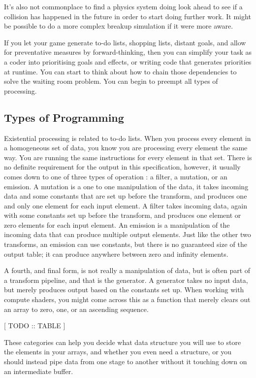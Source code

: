 \documentclass[a4paper,12pt]{article}
\begin{document}
It's also not commonplace to find a physics system doing look ahead to see if a collision has happened in the future in order to start doing further work.
It might be possible to do a more complex breakup simulation if it were more aware.

If you let your game generate to-do lists, shopping lists, distant goals, and allow for preventative measures by forward-thinking, then you can simplify your task as a coder into prioritising goals and effects, or writing code that generates priorities at runtime.
You can start to think about how to chain those dependencies to solve the waiting room problem.
You can begin to preempt all types of processing.

\subsection{Types of Programming}

Existential processing is related to to-do lists.
When you process every element in a homogeneous set of data, you know you are processing every element the same way.
You are running the same instructions for every element in that set.
There is no definite requirement for the output in this specification, however, it usually comes down to one of three types of operation :
a filter, a mutation, or an emission.
A mutation is a one to one manipulation of the data, it takes incoming data and some constants that are set up before the transform, and produces one and only one element for each input element.
A filter takes incoming data, again with some constants set up before the transform, and produces one element or zero elements for each input element.
An emission is a manipulation of the incoming data that can produce multiple output elements.
Just like the other two transforms, an emission can use constants, but there is no guaranteed size of the output table;
it can produce anywhere between zero and infinity elements.

A fourth, and final form, is not really a manipulation of data, but is often part of a transform pipeline, and that is the generator.
A generator takes no input data, but merely produces output based on the constants set up.
When working with compute shaders, you might come across this as a function that merely clears out an array to zero, one, or an ascending sequence.

[ TODO :: TABLE ]

These categories can help you decide what data structure you will use to store the elements in your arrays, and whether you even need a structure, or you should instead pipe data from one stage to another without it touching down on an intermediate buffer.
\end{document}
